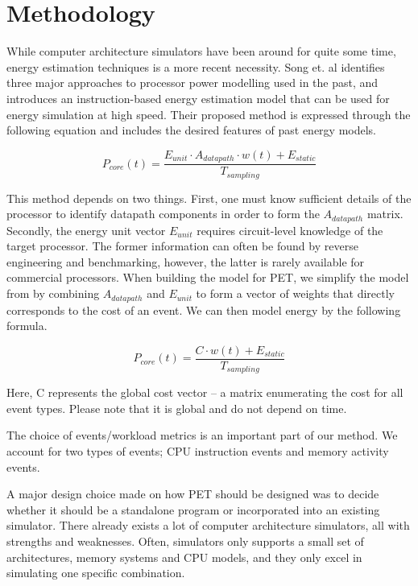 \section{Methodology}

While computer architecture simulators have been around for quite some time,
energy estimation techniques is a more recent necessity. Song et. al
\cite{song2012instruction} identifies three major approaches to processor power
modelling used in the past, and introduces an instruction-based energy
estimation model that can be used for energy simulation at high speed. Their
proposed method is expressed through the following equation and includes the
desired features of past energy models.

\[
    P_{core}(t) = \frac{E_{unit} \cdot A_{datapath} \cdot w(t) +
    E_{static}}{T_{sampling}}
\]

This method depends on two things. First, one must know sufficient details of
the processor to identify datapath components in order to form the
$A_{datapath}$ matrix. Secondly, the energy unit vector $E_{unit}$ requires
circuit-level knowledge of the target processor. The former information can
often be found by reverse engineering and benchmarking, however, the latter is
rarely available for commercial processors. When building the model for PET, we
simplify the model from \cite{song2012instruction} by combining $A_{datapath}$
and $E_{unit}$ to form a vector of weights that directly corresponds to the cost
of an event. We can then model energy by the following formula.

\[
    P_{core}(t) = \frac{C \cdot w(t) + E_{static}}{T_{sampling}}
\]

Here, C represents the global cost vector -- a matrix enumerating the cost
for all event types. Please note that it is global and do not depend on time.

The choice of events/workload metrics is an important part of our method. We
account for two types of events; CPU instruction events and memory activity
events.

A major design choice made on how PET should be designed was to decide whether
it should be a standalone program or incorporated into an existing simulator.
There already exists a lot of computer architecture simulators, all with
strengths and weaknesses. Often, simulators only supports a small set of
architectures, memory systems and CPU models, and they only excel in simulating
one specific combination.

